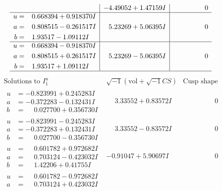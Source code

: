\documentclass[1p]{elsarticle_modified}
\theoremstyle{definition}
\newcommand{\I}{\sqrt{-1}}
\begin{document}
$$\begin{array}{c|c|c}
 & -4.49052 + 1.47159 I & \phantom{-0.000000 } 0 \\ \hline\begin{aligned}
u &= \phantom{-}0.668394 + 0.918370 I \\
a &= \phantom{-}0.808515 - 0.261517 I \\
b &= \phantom{-}1.93517 - 1.09112 I\end{aligned}
 & \phantom{-}5.23269 + 5.06395 I & \phantom{-0.000000 } 0 \\ \hline\begin{aligned}
u &= \phantom{-}0.668394 - 0.918370 I \\
a &= \phantom{-}0.808515 + 0.261517 I \\
b &= \phantom{-}1.93517 + 1.09112 I\end{aligned}
 & \phantom{-}5.23269 - 5.06395 I & \phantom{-0.000000 } 0\\
 \hline 
 \end{array}$$\newpage$$\begin{array}{c|c|c}  
\text{Solutions to }I^u_{1}& \I (\text{vol} + \sqrt{-1}CS) & \text{Cusp shape}\\
 \hline 
\begin{aligned}
u &= -0.823991 + 0.245283 I \\
a &= -0.372283 - 0.132431 I \\
b &= \phantom{-}0.027700 + 0.356730 I\end{aligned}
 & \phantom{-}3.33552 + 0.83572 I & \phantom{-0.000000 } 0 \\ \hline\begin{aligned}
u &= -0.823991 - 0.245283 I \\
a &= -0.372283 + 0.132431 I \\
b &= \phantom{-}0.027700 - 0.356730 I\end{aligned}
 & \phantom{-}3.33552 - 0.83572 I & \phantom{-0.000000 } 0 \\ \hline\begin{aligned}
u &= \phantom{-}0.601782 + 0.972682 I \\
a &= \phantom{-}0.703124 - 0.423032 I \\
b &= \phantom{-}1.42206 + 0.41755 I\end{aligned}
 & -0.91047 + 5.90697 I & \phantom{-0.000000 } 0 \\ \hline\begin{aligned}
u &= \phantom{-}0.601782 - 0.972682 I \\
a &= \phantom{-}0.703124 + 0.423032 I \\

\end{aligned}
\end{array}$$
\end{document}
